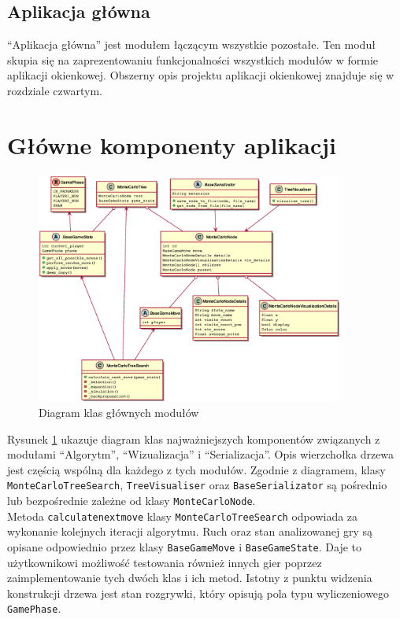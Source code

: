 \documentclass{article}
\let\oldsection\section
\renewcommand\section{\clearpage\oldsection}
\newcommand{\code}[1]{\colorbox{light-gray}{\texttt{#1}}}
\begin{document}
	\subsection{Aplikacja główna}
	``Aplikacja główna'' jest modułem łączącym wszystkie pozostałe. Ten moduł skupia się na zaprezentowaniu funkcjonalności wszystkich modułów w formie aplikacji okienkowej. Obszerny opis projektu aplikacji okienkowej znajduje się w rozdziale czwartym.
	
	\section{Główne komponenty aplikacji}
	\begin{figure}[h]
		\centering
		\includegraphics[width=0.9\textwidth]{umldiagram}
		\caption{Diagram klas głównych modułów}
		\label{rys:umldiagrammain}
	\end{figure}
	
	\noindent Rysunek \ref{rys:umldiagrammain} ukazuje diagram klas najważniejszych komponentów związanych z modułami ``Algorytm'', ``Wizualizacja'' i ``Serializacja''. Opis wierzchołka drzewa jest częścią wspólną dla każdego z tych modułów. Zgodnie z diagramem, klasy \code{MonteCarloTreeSearch}, \code{TreeVisualiser} oraz \code{BaseSerializator} są pośrednio lub bezpośrednie zależne od klasy \code{MonteCarloNode}. \\
	
	\noindent Metoda \code{calculate\textunderscore next\textunderscore move} klasy \code{MonteCarloTreeSearch} odpowiada za wykonanie kolejnych iteracji algorytmu. Ruch oraz stan analizowanej gry są opisane odpowiednio przez klasy \code{BaseGameMove} i \code{BaseGameState}. Daje to użytkownikowi możliwość testowania również innych gier poprzez zaimplementowanie tych dwóch klas i ich metod. Istotny z punktu widzenia konstrukcji drzewa jest stan rozgrywki, który opisują pola typu wyliczeniowego \code{GamePhase}. \\
	
\end{document}
